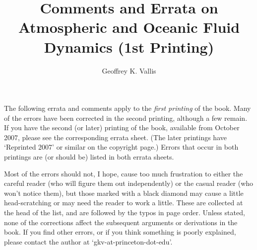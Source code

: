 \documentclass[10pt]{article}
\begin{document}
\title{\sffamily Comments and Errata on Atmospheric and Oceanic Fluid Dynamics (1st Printing)}
\author{\sffamily Geoffrey K. Vallis}
\maketitle
%

\noindent 


The following errata and comments apply to the \emph{first printing} of the book. Many of the errors have been corrected in the second printing, although a few remain. If you have the second (or later) printing of the book, available from October 2007, please see the corresponding errata sheet. (The later printings have `Reprinted 2007' or similar on the copyright page.) Errors that occur in both printings are (or should be) listed in both errata sheets.

Most of the errors should not, I hope, cause too much frustration to either the careful reader (who will figure them out independently) or the casual reader (who won't notice them), but those marked with a black diamond may cause a little head-scratching or may need the reader to work a little. These are collected at the head of the list, and are followed by the typos in page order. Unless stated, none of the corrections affect the subsequent arguments or derivations in the book. If you find other errors, or if you think something is poorly explained, please contact the author at `gkv-at-princeton-dot-edu'. 
\end{document}
